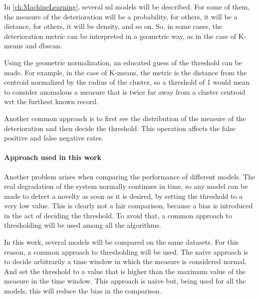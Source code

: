 In \autoref{ch:MachineLearning}, several \gls{ml} models will be described. For some of them, the measure of the deterioration will be a probability, for others, it will be a distance, for others, it will be density, and so on. So, in some cases, the deterioration metric can be interpreted in a geometric way, as in the case of K-means and \gls{dbscan}.

Using the geometric normalization, an educated guess of the threshold can be made. For example, in the case of K-means, the metric is the distance from the centroid normalized by the radius of the cluster, so a threshold of 1 would mean to consider anomalous a measure that is twice far away from a cluster centroid \gls{wrt} the furthest known record.

Another common approach is to first see the distribution of the measure of the deterioration and then decide the threshold. This operation affects the false positive and false negative rates.

\paragraph{Approach used in this work}

Another problem arises when comparing the performance of different models. The real degradation of the system normally continues in time, so any model can be made to detect a novelty as soon as it is desired, by setting the threshold to a very low value. This is clearly not a fair comparison, because a bias is introduced in the act of deciding the threshold. To avoid that, a common approach to thresholding will be used among all the algorithms.

In this work, several models will be compared on the same datasets. For this reason, a common approach to thresholding will be used. The naive approach is to decide arbitrarily a time window in which the measure is considered normal. And set the threshold to a value that is higher than the maximum value of the measure in the time window. This approach is naive but, being used for all the models, this will reduce the bias in the comparison.